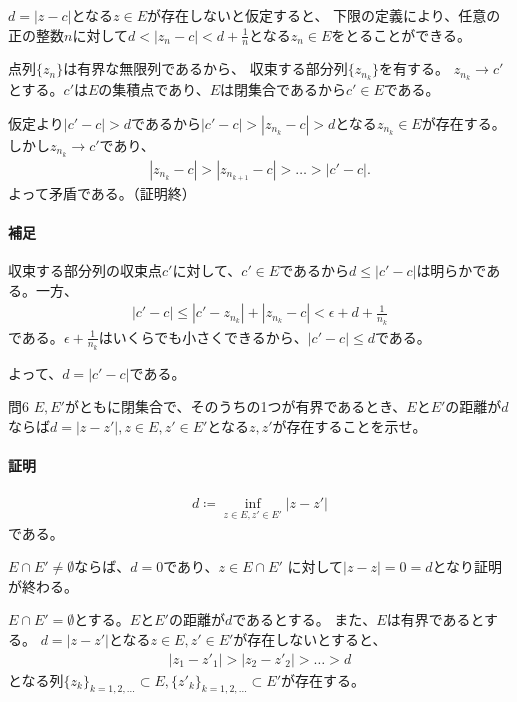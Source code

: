 $d=|z-c|$となる$z\in E$が存在しないと仮定すると、
下限の定義により、任意の正の整数$n$に対して$d<|z_n-c|<d+\frac{1}{n}$となる$z_n\in E$をとることができる。

点列$\{z_n\}$は有界な無限列であるから、
収束する部分列$\{z_{n_k}\}$を有する。
$z_{n_k}\longrightarrow c'$とする。$c'$は$E$の集積点であり、$E$は閉集合であるから$c'\in E$である。

仮定より$|c'-c|>d$であるから$|c'-c|>|z_{n_k}-c|>d$となる$z_{n_k}\in E$が存在する。しかし$z_{n_k}\longrightarrow c'$であり、
\begin{align*}
    |z_{n_k}-c|>|z_{n_{k+1}}-c|>\dots>|c'-c|.
\end{align*}
よって矛盾である。（証明終）

\paragraph{補足}
収束する部分列の収束点$c'$に対して、$c'\in E$であるから$d\le|c'-c|$は明らかである。一方、
\begin{align*}
    |c'-c|\le|c'-z_{n_k}|+|z_{n_k}-c|< \epsilon + d+\frac{1}{n_k}
\end{align*}
である。$\epsilon+\frac{1}{n_k}$はいくらでも小さくできるから、$|c'-c|\le d$である。

よって、$d=|c'-c|$である。

\begin{mysimplebox}{問6}
    $E, E'$がともに閉集合で、そのうちの1つが有界であるとき、$E$と$E'$の距離が$d$ならば$d=|z-z'|, z\in E, z'\in E'$となる$z, z'$が存在することを示せ。
\end{mysimplebox}
\paragraph{証明}
\begin{align*}
    d\coloneqq \inf_{z\in E, z'\in E'}|z-z'|
\end{align*}
である。

$E\cap E'\neq \emptyset$ならば、$d=0$であり、$z\in E\cap E'$
に対して$|z-z|=0=d$となり証明が終わる。

$E\cap E'=\emptyset$とする。$E$と$E'$の距離が$d$であるとする。
また、$E$は有界であるとする。
$d=|z-z'|$となる$z\in E, z'\in E'$が存在しないとすると、
\begin{align*}
    |z_1-z'_1|>|z_2-z'_2|>\dots>d
\end{align*}
となる列$\{z_k\}_{k=1,2,\dots}\subset E, \{z'_k\}_{k=1,2,\dots}\subset E'$が存在する。

